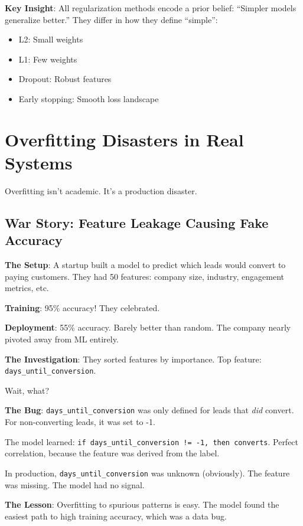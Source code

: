 \documentclass[11pt,oneside]{book}
\begin{document}
\begin{insightbox}
\textbf{Key Insight}: All regularization methods encode a prior belief: ``Simpler models generalize better.'' They differ in how they define ``simple'':
\begin{itemize}
    \item L2: Small weights
    \item L1: Few weights
    \item Dropout: Robust features
    \item Early stopping: Smooth loss landscape
\end{itemize}
\end{insightbox}

\section{Overfitting Disasters in Real Systems}

Overfitting isn't academic. It's a production disaster.

\subsection{War Story: Feature Leakage Causing Fake Accuracy}

\textbf{The Setup}: A startup built a model to predict which leads would convert to paying customers. They had 50 features: company size, industry, engagement metrics, etc.

\textbf{Training}: 95\% accuracy! They celebrated.

\textbf{Deployment}: 55\% accuracy. Barely better than random. The company nearly pivoted away from ML entirely.

\textbf{The Investigation}: They sorted features by importance. Top feature: \texttt{days\_until\_conversion}.

Wait, what?

\textbf{The Bug}: \texttt{days\_until\_conversion} was only defined for leads that \textit{did} convert. For non-converting leads, it was set to -1.

The model learned: \texttt{if days\_until\_conversion != -1, then converts}. Perfect correlation, because the feature was derived from the label.

In production, \texttt{days\_until\_conversion} was unknown (obviously). The feature was missing. The model had no signal.

\textbf{The Lesson}: Overfitting to spurious patterns is easy. The model found the easiest path to high training accuracy, which was a data bug.
\end{document}
